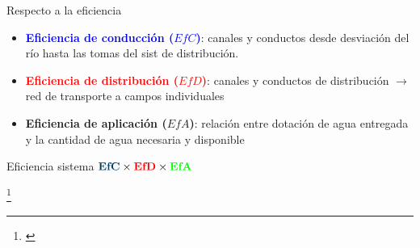 \documentclass{beamer}\usepackage[]{graphicx}\usepackage[]{color}
\newcommand\blfootnote[1]{%
\begingroup
\renewcommand\thefootnote{}\footnote{#1}%
\addtocounter{footnote}{-1}%
\endgroup
}
\begin{document}
\begin{frame}{Respecto a la eficiencia}
\begin{itemize}
          \item \textcolor{blue}{\textbf{Eficiencia de conducción ($EfC$)}}: canales y conductos desde desviación del río hasta las tomas del sist de distribución.
    \pause \item \textcolor{red}{\textbf{Eficiencia de distribución ($EfD$)}}: canales y conductos de distribución $\rightarrow$ red de transporte a campos individuales
    \pause \item \textcolor{green!50!black}{\textbf{Eficiencia de aplicación ($EfA$)}}: relación entre dotación de agua entregada y la cantidad de agua necesaria y disponible
\end{itemize}


\pause
\begin{block}{Eficiencia sistema}
 $\textcolor{darkblue}{\textbf{EfC}} \times \textcolor{red}{\textbf{EfD}} \times \textcolor{green}{\textbf{EfA}}$
\end{block}
      \blfootnote{\scriptsize \citep{Bos1990,Morabito2005}}
\end{frame}      
\end{document}
